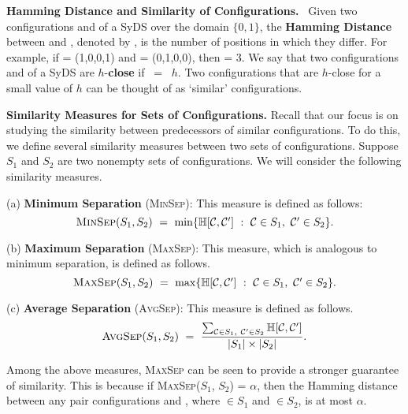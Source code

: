 \smallskip

\noindent
\textbf{Hamming Distance and Similarity of Configurations.}~
Given two configurations \calcone{} and \calctwo{} of a SyDS
over the domain $\{0,1\}$,
the \textbf{Hamming Distance} between \calcone{} and \calctwo, 
denoted by \calh[\calcone, \calctwo], is
the number of positions in which they differ.
For example, if
\calcone{} = (1,0,0,1) and \calctwo{} = (0,1,0,0),   
then \calh[\calcone, \calctwo] = 3.  
We say that two configurations \calcone{} and \calctwo{} 
of a SyDS are $h$-\textbf{close} if \calh[\calco, \calct] ~=~ $h$. 
Two configurations that are $h$-close for a small value of $h$
can be thought of as `similar' configurations.  

\smallskip

\noindent
\textbf{Similarity Measures for Sets of Configurations.} Recall
that our focus is on studying the similarity between predecessors
of similar configurations.
To do this, we define several similarity measures between two sets of
configurations.
Suppose $S_1$ and $S_2$ are two nonempty sets of configurations.
We will consider the following similarity measures.

\newcommand{\minsep}{\mbox{\textsc{MinSep}}}
\newcommand{\maxsep}{\mbox{\textsc{MaxSep}}}
\newcommand{\avgsep}{\mbox{\textsc{AvgSep}}}

\begin{description}
\item{(a)} \textbf{Minimum Separation} (\minsep): This measure is defined as follows:
\[ 
\minsep(S_1, S_2) ~=~ \min\{ \calh[\calc, \calcp] ~:~ 
                                \calc{} \in S_1,~ \calcp{} \in S_2\}.
\]
\item{(b)} \textbf{Maximum Separation} (\maxsep): This measure, which is
analogous to minimum separation, is defined as follows.
\[ 
\maxsep(S_1, S_2) ~=~ \max\{ \calh[\calc, \calcp] ~:~ 
                                \calc{} \in S_1,~ \calcp{} \in S_2\}.
\]
\item{(c)} \textbf{Average Separation} (\avgsep): This measure is defined as follows.
\[ 
\avgsep(S_1, S_2) ~=~ \displaystyle{\frac{\sum_{\mathcal{C} \in S_1,~ \mathcal{C}' \in S_2}
                            \calh[\calc, \calcp]}{|S_1| \times |S_2|}}.
\]
\end{description}
Among the above measures, \maxsep{} can be seen to provide 
a stronger guarantee of similarity.
This is because if \maxsep($S_1$, $S_2$) = $\alpha$, then the Hamming distance
between any pair configurations \calc{} and \calcp, where \calc{} $\in S_1$
and \calcp{} $\in S_2$, is at most $\alpha$.

